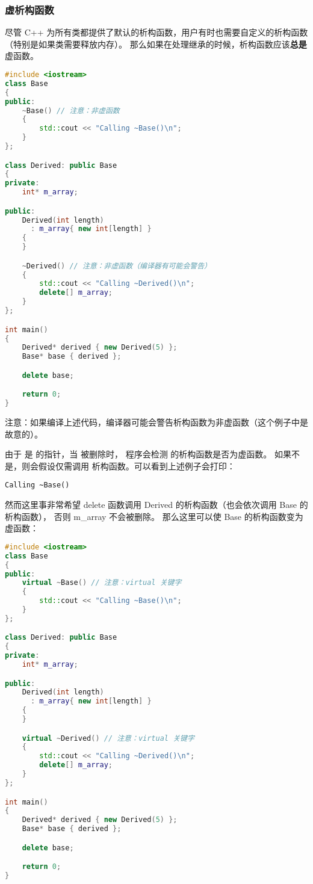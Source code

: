 \documentclass[../../LearnCpp.tex]{subfiles}
\begin{document}

\subsubsection*{虚析构函数}

尽管 C++ 为所有类都提供了默认的析构函数，用户有时也需要自定义的析构函数（特别是如果类需要释放内存）。
那么如果在处理继承的时候，析构函数应该\textbf{总是}虚函数。

\begin{lstlisting}[language=C++]
#include <iostream>
class Base
{
public:
    ~Base() // 注意：非虚函数
    {
        std::cout << "Calling ~Base()\n";
    }
};

class Derived: public Base
{
private:
    int* m_array;

public:
    Derived(int length)
      : m_array{ new int[length] }
    {
    }

    ~Derived() // 注意：非虚函数（编译器有可能会警告）
    {
        std::cout << "Calling ~Derived()\n";
        delete[] m_array;
    }
};

int main()
{
    Derived* derived { new Derived(5) };
    Base* base { derived };

    delete base;

    return 0;
}
\end{lstlisting}

注意：如果编译上述代码，编译器可能会警告析构函数为非虚函数（这个例子中是故意的）。

由于  是  的指针，当  被删除时，
程序会检测  的析构函数是否为虚函数。
如果不是，则会假设仅需调用  析构函数。可以看到上述例子会打印：

\begin{lstlisting}
Calling ~Base()
\end{lstlisting}

然而这里事非常希望 delete 函数调用 Derived 的析构函数（也会依次调用 Base 的析构函数），
否则 m\_array 不会被删除。
那么这里可以使 Base 的析构函数变为虚函数：

\begin{lstlisting}[language=C++]
#include <iostream>
class Base
{
public:
    virtual ~Base() // 注意：virtual 关键字
    {
        std::cout << "Calling ~Base()\n";
    }
};

class Derived: public Base
{
private:
    int* m_array;

public:
    Derived(int length)
      : m_array{ new int[length] }
    {
    }

    virtual ~Derived() // 注意：virtual 关键字
    {
        std::cout << "Calling ~Derived()\n";
        delete[] m_array;
    }
};

int main()
{
    Derived* derived { new Derived(5) };
    Base* base { derived };

    delete base;

    return 0;
}
\end{lstlisting}
\end{document}

